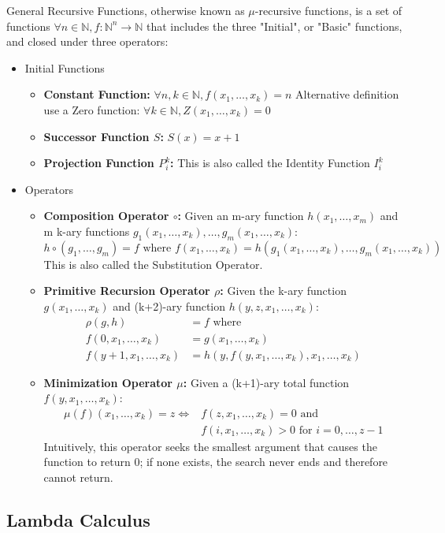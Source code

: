 \documentclass{report}
\begin{document}
				\begin{defn} \label{def_general_recursive_function}
					General Recursive Functions, otherwise known as $\mu$-recursive functions, is a set of functions $\forall n \in \mathbb{N}, f:\mathbb{N}^n \rightarrow \mathbb{N}$ that includes the three "Initial", or "Basic" functions, and closed under three operators:
					\begin{itemize}
						\item Initial Functions
						\begin{itemize}
							\item \textbf{Constant Function:} $\forall n,k \in \mathbb{N}, f(x_1,\dots,x_k)=n$
								\subitem Alternative definition use a Zero function: $\forall k \in \mathbb{N}, Z(x_1,\dots,x_k)=0$
							\item \textbf{Successor Function $S$:} $S(x)=x+1$
							\item \textbf{Projection Function $P_i^k$:}
								\subitem This is also called the Identity Function $I_i^k$
						\end{itemize}
						\item Operators
						\begin{itemize}
							\item \textbf{Composition Operator $\circ$:} Given an m-ary function $h(x_1,\dots,x_m)$ and m k-ary functions $g_1(x_1,\dots,x_k),\dots,g_m(x_1,\dots,x_k)$:
							\begin{displaymath}
								h \circ (g_1,\dots,g_m)=f \text{   where   } f(x_1,\dots,x_k)=h(g_1(x_1,\dots,x_k),\dots,g_m(x_1,\dots,x_k))
							\end{displaymath}
								\subitem This is also called the Substitution Operator.
							\item \textbf{Primitive Recursion Operator $\rho$:} Given the k-ary function $g(x_1,\dots,x_k)$ and (k+2)-ary function $h(y,z,x_1,\dots,x_k)$:
							\begin{align*}
								\rho(g,h)&=f \text{   where}\\
								f(0,x_1,\dots,x_k)&=g(x_1,\dots,x_k)\\
								f(y+1,x_1,\dots,x_k)&=h(y,f(y,x_1,\dots,x_k),x_1,\dots,x_k)
							\end{align*}
							\item \textbf{Minimization Operator $\mu$:} Given a (k+1)-ary total function $f(y,x_1,\dots,x_k)$:
							\begin{align*}
								\mu (f)(x_1,\dots,x_k)=z \Leftrightarrow& f(z,x_1,\dots,x_k)=0 \text{   and}\\&f(i,x_1,\dots,x_k)>0 \text{   for   } i=0,\dots,z-1
							\end{align*}
								\subitem Intuitively, this operator seeks the smallest argument that causes the function to return 0; if none exists, the search never ends and therefore cannot return.
						\end{itemize}
					\end{itemize}
				\end{defn}
			
			\subsection{Lambda Calculus}
			
\end{document}
